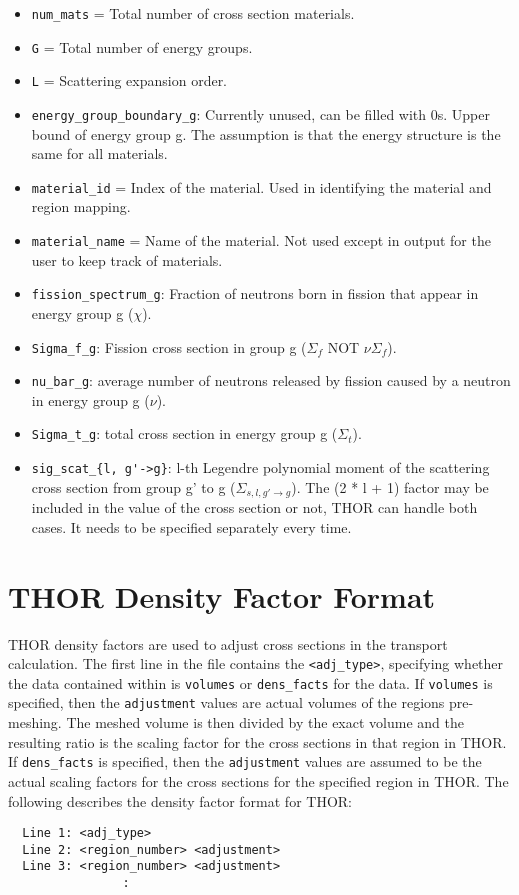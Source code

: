 \begin{itemize}
\item \verb"num_mats" = Total number of cross section materials.
\item \verb"G" = Total number of energy groups.
\item \verb"L" = Scattering expansion order.
\item \verb"energy_group_boundary_g": Currently unused, can be filled with 0s. Upper bound of energy group g. The assumption is that the energy structure is the same for all materials.
\item \verb"material_id" = Index of the material. Used in identifying the material and region mapping.
\item \verb"material_name" = Name of the material. Not used except in output for the user to keep track of materials.
\item \verb"fission_spectrum_g": Fraction of neutrons born in fission that appear in energy group g ($\chi$).
\item \verb"Sigma_f_g": Fission cross section in group g ($\Sigma_f$ NOT $\nu\Sigma_f$).
\item \verb"nu_bar_g": average number of neutrons released by fission caused by a neutron in energy group g ($\nu$).
\item \verb"Sigma_t_g": total cross section in energy group g ($\Sigma_t$).
\item \verb"sig_scat_{l, g'->g}": l-th Legendre polynomial moment of the scattering cross section from group g’ to g ($\Sigma_{s,l,g'\rightarrow g}$). The (2 * l + 1) factor may be included in the value of the cross section or not, THOR can handle both cases. It needs to be specified separately every time.
\end{itemize}

\section{THOR Density Factor Format}\label{ch:inp:sec:densfact}

THOR density factors are used to adjust cross sections in the transport calculation.
The first line in the file contains the \verb"<adj_type>", specifying whether the data contained within is \verb"volumes" or \verb"dens_facts" for the data.
If \verb"volumes" is specified, then the \verb"adjustment" values are actual volumes of the regions pre-meshing.
The meshed volume is then divided by the exact volume and the resulting ratio is the scaling factor for the cross sections in that region in THOR.
If \verb"dens_facts" is specified, then the \verb"adjustment" values are assumed to be the actual scaling factors for the cross sections for the specified region in THOR.
The following describes the density factor format for THOR:
\begin{verbatim}
  Line 1: <adj_type>
  Line 2: <region_number> <adjustment>
  Line 3: <region_number> <adjustment>
                :
\end{verbatim}
